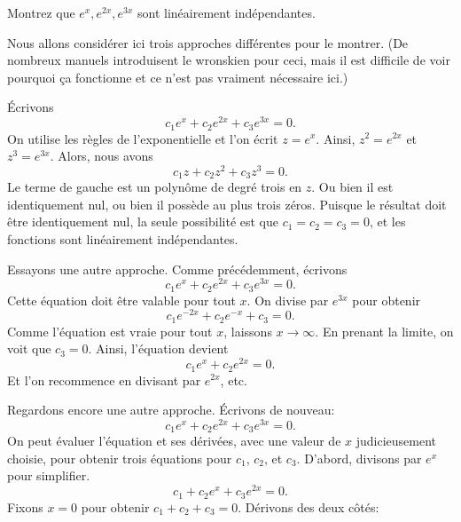 \begin{example}
	Montrez que $e^x, e^{2x}, e^{3x}$ sont linéairement indépendantes.
	
	Nous allons considérer ici trois approches différentes pour le montrer.
	(De nombreux manuels introduisent le wronskien pour ceci, mais il est difficile de voir pourquoi ça fonctionne et
	ce n'est pas vraiment nécessaire ici.)
	
	Écrivons
	\begin{equation*}
		c_1 e^x + c_2 e^{2x} + c_3 e^{3x} = 0.
	\end{equation*}
	On utilise les règles de l'exponentielle et l'on écrit $z = e^x$.  
	Ainsi, $z^2 = e^{2x}$ et $z^3 = e^{3x}$.  
	Alors, nous avons
	\begin{equation*}
		c_1 z + c_2 z^2 + c_3 z^3 = 0.
	\end{equation*}
	Le terme de gauche est un polynôme de degré trois en $z$.
	Ou bien il est identiquement nul, ou bien il possède au plus trois zéros. 
	Puisque le résultat doit être identiquement nul, la seule possibilité est que 
	$c_1 = c_2 = c_3 = 0$, et les fonctions sont linéairement indépendantes. 
	
	Essayons une autre approche. Comme précédemment, écrivons 
	\begin{equation*}
		c_1 e^x + c_2 e^{2x} + c_3 e^{3x} = 0.
	\end{equation*}
	Cette équation doit être valable pour tout $x$.  On divise par  $e^{3x}$ pour obtenir
	\begin{equation*}
		c_1 e^{-2x} + c_2 e^{-x} + c_3 = 0.
	\end{equation*}
	Comme l'équation est vraie pour tout $x$, laissons $x \to \infty$.  En prenant la limite, on voit que $c_3 = 0$.  Ainsi, l'équation devient 
	\begin{equation*}
		c_1 e^x + c_2 e^{2x} = 0.
	\end{equation*}
	Et l'on recommence en divisant par $e^{2x}$, etc.
	
	Regardons encore une autre approche. Écrivons de nouveau:  
	\begin{equation*}
		c_1 e^x + c_2 e^{2x} + c_3 e^{3x} = 0.
	\end{equation*}
	On peut évaluer l'équation et ses dérivées, avec une valeur de $x$ judicieusement choisie, pour obtenir trois équations pour 
	$c_1$, $c_2$, et $c_3$.
	D'abord, divisons par $e^{x}$ pour simplifier.
	\begin{equation*}
		c_1 + c_2 e^{x} + c_3 e^{2x} = 0.
	\end{equation*}
	Fixons $x=0$ pour obtenir $c_1 + c_2 + c_3 = 0$.  Dérivons des deux côtés: 
	

\end{example}
